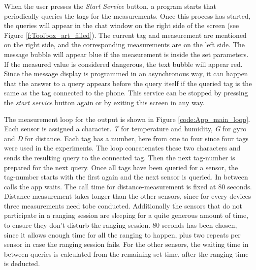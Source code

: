 When the user presses the \textit{Start Service} button, a program starts that periodically queries the tags for the measurements.
Once this process has started, the queries will appear in the chat window on the right side of the screen (see Figure \ref{f:Toolbox_art_filled}).
The current tag and measurement are mentioned on the right side, and the corresponding measurements are on the left side.
The message bubble will appear blue if the measurement is inside the set parameters.
If the measured value is considered dangerous, the text bubble will appear red.
Since the message display is programmed in an asynchronous way, it can happen that the answer to a query appears before the query itself if the queried tag is the same as the tag connected to the phone.
This service can be stopped by pressing the \textit{start service} button again or by exiting this screen in any way.

The measurement loop for the output is shown in Figure \ref{code:App_main_loop}.
Each sensor is assigned a character.
\textit{T} for temperature and humidity, \textit{G} for gyro and \textit{D} for distance.
Each tag has a number, here from one to four since four tags were used in the experiments.
The loop concatenates these two characters and sends the resulting query to the connected tag.
Then the next tag-number is prepared for the next query.
Once all tags have been queried for a sensor, the tag-number starts with the first again and the next sensor is queried.
In between calls the app waits.
The call time for distance-measurement is fixed at 80 seconds.
Distance measurement takes longer than the other sensors, since for every devices three measurements need tobe conducted.
Additionally the sensors that do not participate in a ranging session are sleeping for a quite generous amount of time, to ensure they don't disturb the ranging session.
80 seconds has been chosen, since it allows enough time for all the ranging to happen, plus two repeats per sensor in case the ranging session fails.
For the other sensors, the waiting time in between queries is calculated from the remaining set time, after the ranging time is deducted.

